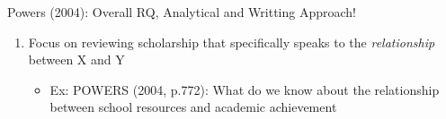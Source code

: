 \documentclass[
  8pt,
  ignorenonframetext,
  dvipsnames]{beamer}
\providecommand{\tightlist}{%
  \setlength{\itemsep}{0pt}\setlength{\parskip}{0pt}}
\let\olditem\item
\renewcommand{\item}{%
  \olditem\vspace{4pt}
}
\begin{document}
\begin{frame}{Powers (2004): Overall RQ, Analytical and Writting
Approach!}
\begin{itemize}
\begin{enumerate}
    \begin{itemize}
    \tightlist
    \item
      EX: What is the (predicted) probability of a student persisting
      into their 2nd year of college?; review scholarship on what we
      know about persistence (more likely to persist if you're involved
      on campus, live on campus, etc.)
    \end{itemize}
  \item
    Focus on reviewing scholarship that specifically speaks to the
    \emph{relationship} between X and Y

    \begin{itemize}
    \tightlist
    \item
      Ex: POWERS (2004, p.772): What do we know about the relationship
      between school resources and academic achievement
    \end{itemize}
  \end{enumerate}
\end{itemize}

\end{frame}
\end{document}
